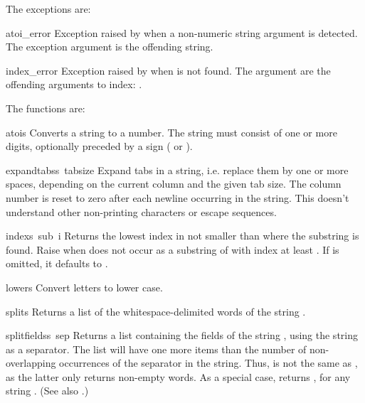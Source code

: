 The exceptions are:

\renewcommand{\indexsubitem}{(exception in module string)}
\begin{excdesc}{atoi_error}
Exception raised by
when a non-numeric string argument is detected.
The exception argument is the offending string.
\end{excdesc}

\begin{excdesc}{index_error}
Exception raised by  when  is not found.  The
argument are the offending arguments to index: .
\end{excdesc}

The functions are:

\renewcommand{\indexsubitem}{(in module string)}
\begin{funcdesc}{atoi}{s}
Converts a string to a number.  The string must consist of one or more
digits, optionally preceded by a sign (\samp{+} or \samp{-}).
\end{funcdesc}

\begin{funcdesc}{expandtabs}{s\, tabsize}
Expand tabs in a string, i.e. replace them by one or more spaces,
depending on the current column and the given tab size.  The column
number is reset to zero after each newline occurring in the string.
This doesn't understand other non-printing characters or escape
sequences.
\end{funcdesc}

\begin{funcdesc}{index}{s\, sub\, i}
Returns the lowest index in  not smaller than  where the
substring  is found.  Raise  when 
does not occur as a substring of  with index at least .
If  is omitted, it defaults to .
\end{funcdesc}

\begin{funcdesc}{lower}{s}
Convert letters to lower case.
\end{funcdesc}

\begin{funcdesc}{split}{s}
Returns a list of the whitespace-delimited words of the string
.
\end{funcdesc}

\begin{funcdesc}{splitfields}{s\, sep}
  Returns a list containing the fields of the string , using
  the string  as a separator.  The list will have one more
  items than the number of non-overlapping occurrences of the
  separator in the string.  Thus,  is not the same as , as the latter
  only returns non-empty words.  As a special case,
   returns \code{[\var{s}]}, for any string
  .  (See also .)
\end{funcdesc}

